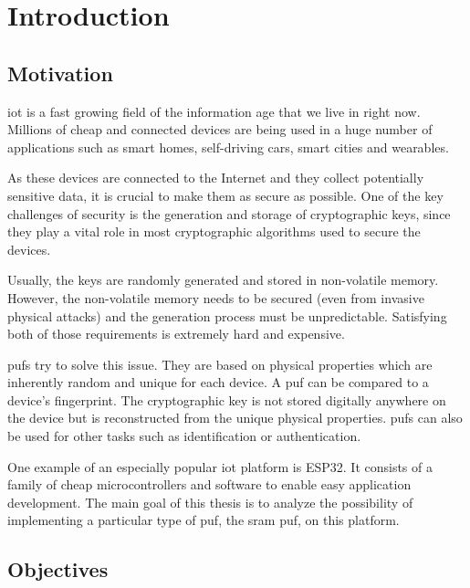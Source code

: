 \chapter{Introduction}\label{sec:introduction}

\section{Motivation}

\Gls{iot} is a fast growing field of the information age that we live in right now. Millions of cheap and connected devices are being used in a huge number of applications such as smart homes, self-driving cars, smart cities and wearables.

As these devices are connected to the Internet and they collect potentially sensitive data, it is crucial to make them as secure as possible. One of the key challenges of security is the generation and storage of cryptographic keys, since they play a vital role in most cryptographic algorithms used to secure the devices.

Usually, the keys are randomly generated and stored in non-volatile memory. However, the non-volatile memory needs to be secured (even from invasive physical attacks) and the generation process must be unpredictable. Satisfying both of those requirements is extremely hard and expensive.

\Glspl{puf} try to solve this issue. They are based on physical properties which are inherently random and unique for each device. A \gls{puf} can be compared to a device's fingerprint. The cryptographic key is not stored digitally anywhere on the device but is reconstructed from the unique physical properties. \Glspl{puf} can also be used for other tasks such as identification or authentication.

One example of an especially popular \gls{iot} platform is ESP32. It consists of a family of cheap microcontrollers and software to enable easy application development. The main goal of this thesis is to analyze the possibility of implementing a particular type of \gls{puf}, the \gls{sram} \gls{puf}, on this platform.

\section{Objectives}

